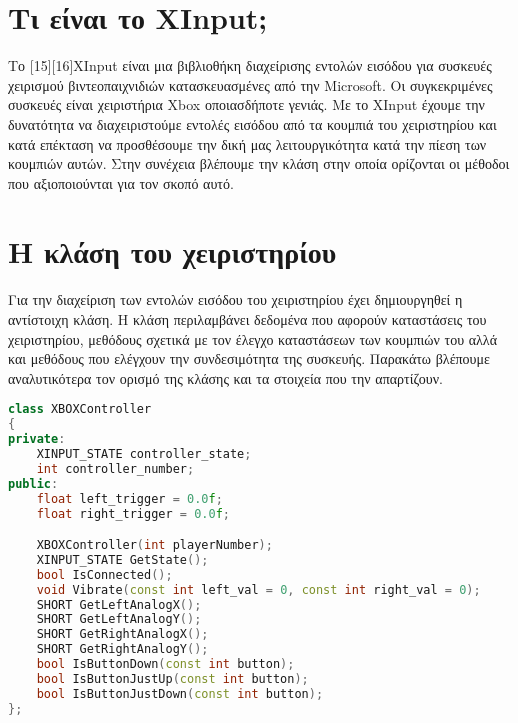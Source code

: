 



\section{Τι είναι το XInput;}
Το [15][16]XInput είναι μια βιβλιοθήκη διαχείρισης εντολών εισόδου για
συσκευές χειρισμού βιντεοπαιχνιδιών κατασκευασμένες από την Microsoft.
Οι συγκεκριμένες συσκευές είναι χειριστήρια Xbox οποιασδήποτε γενιάς. Με
το XInput έχουμε την δυνατότητα να διαχειριστούμε εντολές εισόδου από τα
κουμπιά του χειριστηρίου και κατά επέκταση να προσθέσουμε την δική μας λειτουργικότητα
κατά την πίεση των κουμπιών αυτών. Στην συνέχεια βλέπουμε την κλάση στην οποία ορίζονται
οι μέθοδοι που αξιοποιούνται για τον σκοπό αυτό.

\section{Η κλάση του χειριστηρίου}

Για την διαχείριση των εντολών εισόδου του χειριστηρίου έχει δημιουργηθεί
η αντίστοιχη κλάση. Η κλάση περιλαμβάνει δεδομένα που αφορούν καταστάσεις
του χειριστηρίου, μεθόδους σχετικά με τον έλεγχο καταστάσεων των κουμπιών
του αλλά και μεθόδους που ελέγχουν την συνδεσιμότητα της συσκευής. Παρακάτω
βλέπουμε αναλυτικότερα τον ορισμό της κλάσης και τα στοιχεία που την απαρτίζουν.

\begin{lstlisting}[language=C++, style=cppstyle]
class XBOXController
{
private:
    XINPUT_STATE controller_state;
    int controller_number;
public:
    float left_trigger = 0.0f;
    float right_trigger = 0.0f;

    XBOXController(int playerNumber);
    XINPUT_STATE GetState();
    bool IsConnected();
    void Vibrate(const int left_val = 0, const int right_val = 0);
    SHORT GetLeftAnalogX();
    SHORT GetLeftAnalogY();
    SHORT GetRightAnalogX();
    SHORT GetRightAnalogY();
    bool IsButtonDown(const int button);
    bool IsButtonJustUp(const int button);
    bool IsButtonJustDown(const int button);
};
\end{lstlisting}





\begin{lstlisting}[language=C++, style=cppstyle]
\end{lstlisting}